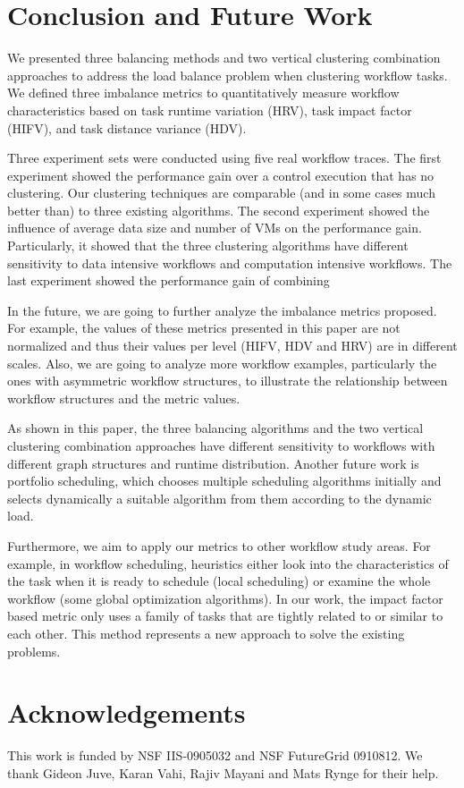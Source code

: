 \section{Conclusion and Future Work}

We presented three balancing methods and two vertical clustering combination approaches to address the load balance problem when clustering workﬂow tasks. We deﬁned three imbalance metrics to quantitatively measure workﬂow characteristics based on task runtime variation (HRV), task impact factor (HIFV), and task distance variance (HDV).

Three experiment sets were conducted using five real workflow traces. The first experiment showed the performance gain over a control execution that has no clustering. Our clustering techniques are comparable (and in some cases much better than) to three existing algorithms. The second experiment showed the influence of average data size and number of VMs on the performance gain. Particularly, it showed that the three clustering algorithms have different sensitivity to data intensive workflows and computation intensive workflows. The last experiment showed the performance gain of combining 

In the future, we are going to further analyze the imbalance metrics proposed. For example, the values of these metrics presented in this paper are not normalized and thus their values per level (HIFV, HDV and HRV) are in different scales. Also, we are going to analyze more workflow examples, particularly the ones with asymmetric workflow structures, to illustrate the relationship between workflow structures and the metric values. 

As shown in this paper, the three balancing algorithms and the two vertical clustering combination approaches have different sensitivity to workflows with different graph structures and runtime distribution. Another future work is portfolio scheduling, which chooses multiple scheduling algorithms initially and selects dynamically a suitable algorithm from them according to the dynamic load. 

Furthermore, we aim to apply our metrics to other workflow study areas. For example, in workflow scheduling, heuristics either look into the characteristics of the task when it is ready to schedule (local scheduling) or examine the whole workflow (some global optimization algorithms). In our work, the impact factor based metric only uses a family of tasks that are tightly related to or similar to each other.  This method represents a new approach to solve the existing problems. 

\section{Acknowledgements}
This work is funded by NSF IIS-0905032 and NSF FutureGrid 0910812. We thank Gideon Juve, Karan Vahi, Rajiv Mayani and Mats Rynge for their help. 